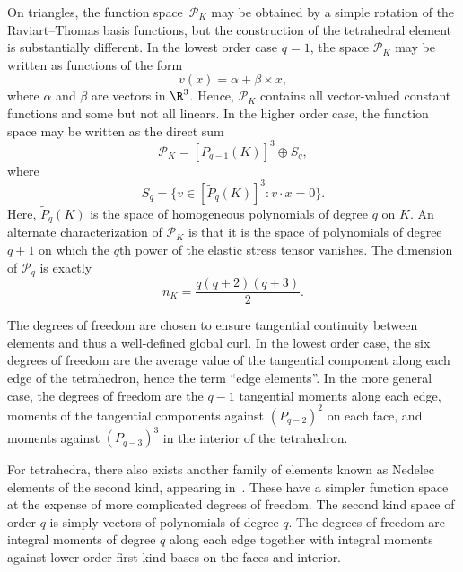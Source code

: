 On triangles, the function space~$\mathcal{P}_K$ may be obtained by a
simple rotation of the Raviart--Thomas basis functions, but the
construction of the tetrahedral element is substantially different. In
the lowest order case \( q = 1 \), the space \( \mathcal{P}_K \) may
be written as functions of the form
\[
v(x) = \alpha + \beta \times x,
\]
where \( \alpha \) and \( \beta \) are vectors in \( \R^3 \).  Hence,
$\mathcal{P}_K$ contains all vector-valued constant functions and some
but not all linears. In the higher order case, the function space may
be written as the direct sum
\[
\mathcal{P}_K = [P_{q-1}(K)]^3 \oplus S_q,
\]
where
\[
S_q = \{ v \in [\tilde{P}_q(K)]^3 : v \cdot x = 0 \}.
\]
Here, \( \tilde{P}_q(K) \) is the space of homogeneous polynomials of
degree \( q \) on $K$. An alternate characterization of
$\mathcal{P}_K$ is that it is the space of polynomials of degree \( q
+ 1 \) on which the $q$th power of the elastic stress tensor
vanishes. The dimension of $\mathcal{P}_q$ is exactly
\begin{displaymath}
  n_K = \frac{q(q+2)(q+3)}{2}.
\end{displaymath}



The degrees of freedom are chosen to ensure tangential continuity
between elements and thus a well-defined global curl. In the lowest
order case, the six degrees of freedom are the average value of the
tangential component along each edge of the tetrahedron, hence the
term ``edge elements''.  In the more general case, the degrees of
freedom are the \( q-1 \) tangential moments along each edge, moments
of the tangential components against \( (P_{q-2})^2 \) on each face,
and moments against \( (P_{q-3})^3 \) in the interior of the
tetrahedron.

For tetrahedra, there also exists another family of elements known as
Nedelec elements of the second kind, appearing in~\cite{Nedelec1986}.
These have a simpler function space at the expense of more complicated
degrees of freedom.  The second kind space of order \( q \) is simply
vectors of polynomials of degree \( q \). The degrees of freedom are
integral moments of degree \( q \) along each edge together with
integral moments against lower-order first-kind bases on the faces and
interior.


